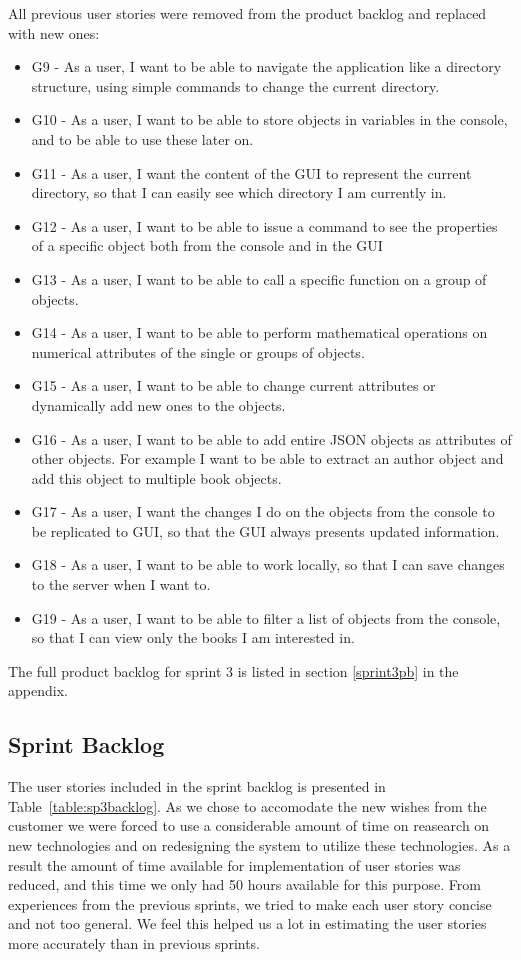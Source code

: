 All previous user stories were removed from the product backlog and replaced with new ones:
\begin{itemize}
\item G9 - As a user, I want to be able to navigate the application like a directory structure, using simple commands to change the current directory.
\item G10 - As a user, I want to be able to store objects in variables in the console, and to be able to use these later on.
\item G11 - As a user, I want the content of the GUI to represent the current directory, so that I can easily see which directory I am currently in.
\item G12 - As a user, I want to be able to issue a command to see the properties of a specific object both from the console and in the GUI
\item G13 - As a user, I want to be able to call a specific function on a group of objects.
\item G14 - As a user, I want to be able to perform mathematical operations on numerical attributes of the single or groups of objects.
\item G15 - As a user, I want to be able to change current attributes or dynamically add new ones to the objects.
\item G16 - As a user, I want to be able to add entire JSON objects as attributes of other objects. For example I want to be able to extract an author object and add this object to multiple book objects.
\item G17 - As a user, I want the changes I do on the objects from the console to be replicated to GUI, so that the GUI always presents updated information.
\item G18 - As a user, I want to be able to work locally, so that I can save changes to the server when I want to.
\item G19 - As a user, I want to be able to filter a list of objects from the console, so that I can view only the books I am interested in.
\end{itemize}

The full product backlog for sprint 3 is listed in section \ref{sprint3pb} in the appendix.



\subsection{Sprint Backlog}
The user stories included in the sprint backlog is presented in Table~\ref{table:sp3backlog}. As we chose to accomodate the new wishes from the customer we were forced to use a considerable amount of time on reasearch on new technologies and on redesigning the system to utilize these technologies. As a result the amount of time available for implementation of user stories was reduced, and this time we only had 50 hours available for this purpose. From experiences from the previous sprints, we tried to make each user story concise and not too general. We feel this helped us a lot in estimating the user stories more accurately than in previous sprints.

